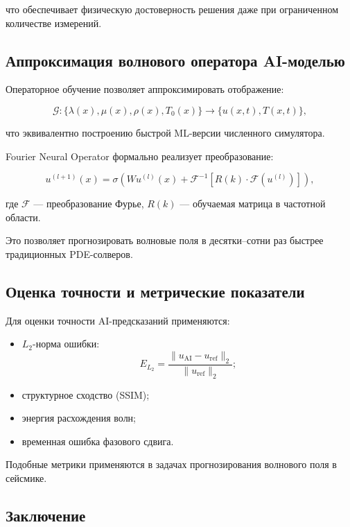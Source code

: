 что обеспечивает физическую достоверность решения даже при ограниченном количестве измерений.

\subsection{Аппроксимация волнового оператора AI-моделью}

Операторное обучение позволяет аппроксимировать отображение:

\[
\mathcal{G} : 
\{ \lambda(x), \mu(x), \rho(x), T_0(x) \}
\rightarrow
\{ u(x,t), T(x,t) \},
\]

что эквивалентно построению быстрой ML-версии численного симулятора.  

Fourier Neural Operator формально реализует преобразование:

\begin{equation}
u^{(l+1)}(x) = \sigma\left( 
W u^{(l)}(x) + \mathcal{F}^{-1} \left[ R(k) \cdot \mathcal{F}(u^{(l)}) \right]
\right),
\end{equation}

где $\mathcal{F}$ — преобразование Фурье, $R(k)$ — обучаемая матрица в частотной области.  

Это позволяет прогнозировать волновые поля в десятки–сотни раз быстрее традиционных PDE-солверов.

\subsection{Оценка точности и метрические показатели}

Для оценки точности AI-предсказаний применяются:

\begin{itemize}
    \item $L_2$-норма ошибки:  
    \[
    E_{L_2} = \frac{\|u_{\text{AI}} - u_{\text{ref}}\|_2}{\|u_{\text{ref}}\|_2};
    \]
    \item структурное сходство (SSIM);
    \item энергия расхождения волн;
    \item временная ошибка фазового сдвига.
\end{itemize}

Подобные метрики применяются в задачах прогнозирования волнового поля в сейсмике.

\subsection{Заключение}

